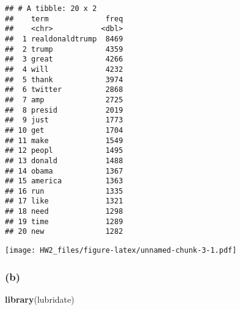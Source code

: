 \documentclass[]{article}
\newenvironment{Shaded}{\begin{snugshade}}{\end{snugshade}}
\newcommand{\KeywordTok}[1]{\textcolor[rgb]{0.13,0.29,0.53}{\textbf{#1}}}
\newcommand{\DataTypeTok}[1]{\textcolor[rgb]{0.13,0.29,0.53}{#1}}
\newcommand{\DecValTok}[1]{\textcolor[rgb]{0.00,0.00,0.81}{#1}}
\newcommand{\StringTok}[1]{\textcolor[rgb]{0.31,0.60,0.02}{#1}}
\newcommand{\OperatorTok}[1]{\textcolor[rgb]{0.81,0.36,0.00}{\textbf{#1}}}
\newcommand{\NormalTok}[1]{#1}
\begin{document}
\begin{verbatim}
## # A tibble: 20 x 2
##    term             freq
##    <chr>           <dbl>
##  1 realdonaldtrump  8469
##  2 trump            4359
##  3 great            4266
##  4 will             4232
##  5 thank            3974
##  6 twitter          2868
##  7 amp              2725
##  8 presid           2019
##  9 just             1773
## 10 get              1704
## 11 make             1549
## 12 peopl            1495
## 13 donald           1488
## 14 obama            1367
## 15 america          1363
## 16 run              1335
## 17 like             1321
## 18 need             1298
## 19 time             1289
## 20 new              1282
\end{verbatim}

\begin{Shaded}
\end{Shaded}

\texttt{[image: HW2\_files/figure-latex/unnamed-chunk-3-1.pdf]}

\subsubsection{(b)}\label{b}

\begin{Shaded}
\begin{Highlighting}[]
\KeywordTok{library}\NormalTok{(lubridate)}
\end{Highlighting}
\end{Shaded}
\end{document}

